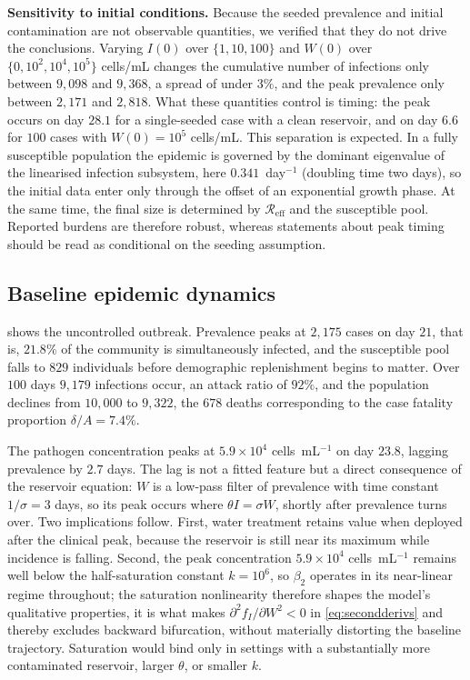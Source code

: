 \documentclass[11pt]{article}
\theoremstyle{plain}
\theoremstyle{definition}
\theoremstyle{remark}
\newcommand{\Reff}{\mathcal{R}_{\mathrm{eff}}}
\begin{document}
\textbf{Sensitivity to initial conditions.} Because the seeded prevalence and initial contamination are not observable quantities, we verified that they do not drive the conclusions. Varying $I(0)$ over $\{1,10,100\}$ and $W(0)$ over $\{0,10^2,10^4,10^5\}$ cells/mL changes the cumulative number of infections only between $9{,}098$ and $9{,}368$, a spread of under $3\%$, and the peak prevalence only between $2{,}171$ and $2{,}818$. What these quantities control is timing: the peak occurs on day $28.1$ for a single-seeded case with a clean reservoir, and on day $6.6$ for $100$ cases with $W(0)=10^5$ cells/mL. This separation is expected. In a fully susceptible population the epidemic is governed by the dominant eigenvalue of the linearised infection subsystem, here $0.341$~day$^{-1}$ (doubling time two days), so the initial data enter only through the offset of an exponential growth phase. At the same time, the final size is determined by $\Reff$ and the susceptible pool. Reported burdens are therefore robust, whereas statements about peak timing should be read as conditional on the seeding assumption.

\subsection{Baseline epidemic dynamics}\label{subsec:baseline}

 shows the uncontrolled outbreak. Prevalence peaks at $2{,}175$ cases on day $21$, that is, $21.8\%$ of the community is simultaneously infected, and the susceptible pool falls to $829$ individuals before demographic replenishment begins to matter. Over $100$ days $9{,}179$ infections occur, an attack ratio of $92\%$, and the population declines from $10{,}000$ to $9{,}322$, the $678$ deaths corresponding to the case fatality proportion $\delta/A=7.4\%$.

The pathogen concentration peaks at $5.9\times10^4$ cells~mL$^{-1}$ on day $23.8$, lagging prevalence by $2.7$ days. The lag is not a fitted feature but a direct consequence of the reservoir equation: $W$ is a low-pass filter of prevalence with time constant $1/\sigma=3$ days, so its peak occurs where $\theta I=\sigma W$, shortly after prevalence turns over. Two implications follow. First, water treatment retains value when deployed after the clinical peak, because the reservoir is still near its maximum while incidence is falling. Second, the peak concentration $5.9\times10^4$ cells~mL$^{-1}$ remains well below the half-saturation constant $k=10^6$, so $\beta_2$ operates in its near-linear regime throughout; the saturation nonlinearity therefore shapes the model's qualitative properties, it is what makes $\partial^2f_I/\partial W^2<0$ in \eqref{eq:secondderivs} and thereby excludes backward bifurcation, without materially distorting the baseline trajectory. Saturation would bind only in settings with a substantially more contaminated reservoir, larger $\theta$, or smaller $k$.
\end{document}
